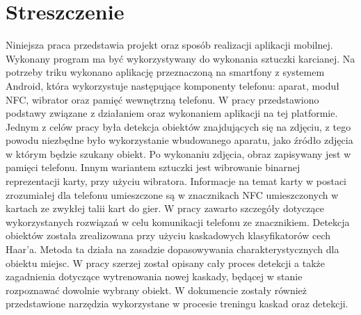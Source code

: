 \section*{Streszczenie}
Niniejsza praca przedstawia projekt oraz sposób realizacji aplikacji mobilnej. Wykonany program ma być wykorzystywany do wykonania sztuczki karcianej. Na potrzeby triku wykonano aplikację przeznaczoną na smartfony z systemem Android, która wykorzystuje następujące komponenty telefonu: aparat, moduł NFC, wibrator oraz pamięć wewnętrzną telefonu. W pracy przedstawiono podstawy związane z działaniem oraz wykonaniem aplikacji na tej platformie. Jednym z celów pracy była detekcja obiektów znajdujących się na zdjęciu, z tego powodu niezbędne było wykorzystanie wbudowanego aparatu, jako źródło zdjęcia w którym będzie szukany obiekt. Po wykonaniu zdjęcia, obraz zapisywany jest w pamięci telefonu. Innym wariantem sztuczki jest wibrowanie binarnej reprezentacji karty, przy użyciu wibratora. Informacje na temat karty w postaci zrozumiałej dla telefonu umieszczone są w znacznikach NFC umieszczonych w kartach ze zwykłej talii kart do gier. W pracy zawarto szczegóły dotyczące wykorzystanych rozwiązań w celu komunikacji telefonu ze znacznikiem. Detekcja obiektów została zrealizowana przy użyciu kaskadowych klasyfikatorów cech Haar'a. Metoda ta działa na zasadzie dopasowywania charakterystycznych dla obiektu miejsc. W pracy szerzej został opisany cały proces detekcji a także zagadnienia dotyczące wytrenowania nowej kaskady, będącej w stanie rozpoznawać dowolnie wybrany obiekt. W dokumencie zostały również przedstawione narzędzia wykorzystane w procesie treningu kaskad oraz detekcji.


